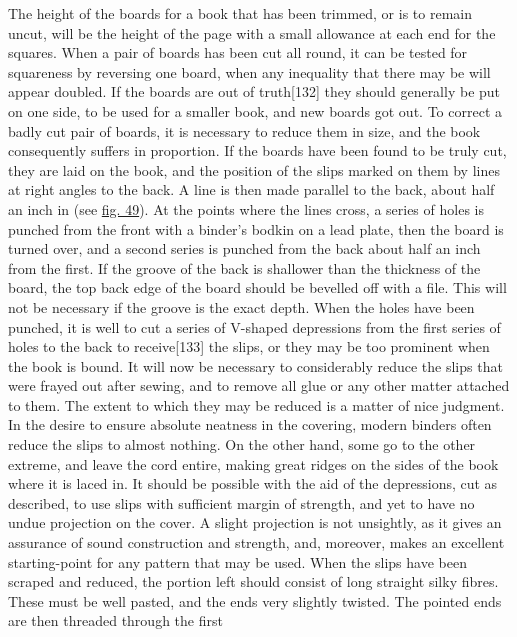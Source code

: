 \documentclass[
]{article}
\begin{document}
The height of the boards for a book that has been trimmed, or is to
remain uncut, will be the height of the page with a small allowance at
each end for the squares. When a pair of boards has been cut all round,
it can be tested for squareness by reversing one board, when any
inequality that there may be will appear doubled. If the boards are out
of truth{\protect\hypertarget{Page_132}{}{{[}132{]}}} they should
generally be put on one side, to be used for a smaller book, and new
boards got out. To correct a badly cut pair of boards, it is necessary
to reduce them in size, and the book consequently suffers in proportion.
If the boards have been found to be truly cut, they are laid on the
book, and the position of the slips marked on them by lines at right
angles to the back. A line is then made parallel to the back, about half
an inch in (see \protect\hyperlink{Fig_49}{fig. 49}). At the points
where the lines cross, a series of holes is punched from the front with
a binder's bodkin on a lead plate, then the board is turned over, and a
second series is punched from the back about half an inch from the
first. If the groove of the back is shallower than the thickness of the
board, the top back edge of the board should be bevelled off with a
file. This will not be necessary if the groove is the exact depth. When
the holes have been punched, it is well to cut a series of V-shaped
depressions from the first series of holes to the back to
receive{\protect\hypertarget{Page_133}{}{{[}133{]}}} the slips, or they
may be too prominent when the book is bound. It will now be necessary to
considerably reduce the slips that were frayed out after sewing, and to
remove all glue or any other matter attached to them. The extent to
which they may be reduced is a matter of nice judgment. In the desire to
ensure absolute neatness in the covering, modern binders often reduce
the slips to almost nothing. On the other hand, some go to the other
extreme, and leave the cord entire, making great ridges on the sides of
the book where it is laced in. It should be possible with the aid of the
depressions, cut as described, to use slips with sufficient margin of
strength, and yet to have no undue projection on the cover. A slight
projection is not unsightly, as it gives an assurance of sound
construction and strength, and, moreover, makes an excellent
starting-point for any pattern that may be used. When the slips have
been scraped and reduced, the portion left should consist of long
straight silky fibres. These must be well pasted, and the ends very
slightly twisted. The pointed ends are then threaded through the first
\end{document}
